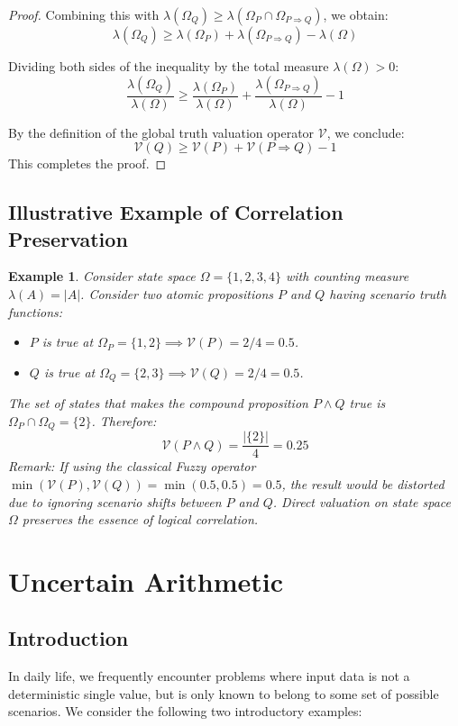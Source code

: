 \documentclass[a4paper,12pt,twoside]{memoir}
\newtheorem{example}{Example}[chapter]
\newcommand{\ddclmd}{\mathcal{V}} %
\begin{document}
\begin{proof}
		Combining this with $\lambda(\Omega_Q) \ge \lambda(\Omega_P \cap \Omega_{P \Rightarrow Q})$, we obtain:
		\[
		\lambda(\Omega_Q) \ge \lambda(\Omega_P) + \lambda(\Omega_{P \Rightarrow Q}) - \lambda(\Omega)
		\]
		
		Dividing both sides of the inequality by the total measure $\lambda(\Omega) > 0$:
		\[
		\frac{\lambda(\Omega_Q)}{\lambda(\Omega)} \ge \frac{\lambda(\Omega_P)}{\lambda(\Omega)} + \frac{\lambda(\Omega_{P \Rightarrow Q})}{\lambda(\Omega)} - 1
		\]
		
		By the definition of the global truth valuation operator $\ddclmd$, we conclude:
		\[
		\ddclmd(Q) \ge \ddclmd(P) + \ddclmd(P \Rightarrow Q) - 1
		\]
		This completes the proof.
	\end{proof}
	\section{Illustrative Example of Correlation Preservation}
	\begin{example}
		Consider state space $\Omega = \{1, 2, 3, 4\}$ with counting measure $\lambda(A) = |A|$. Consider two atomic propositions $P$ and $Q$ having scenario truth functions:
		\begin{itemize}[leftmargin=*]
			\item $P$ is true at $\Omega_P = \{1, 2\} \implies \ddclmd(P) = 2/4 = 0.5$.
			\item $Q$ is true at $\Omega_Q = \{2, 3\} \implies \ddclmd(Q) = 2/4 = 0.5$.
		\end{itemize}
		The set of states that makes the compound proposition $P \land Q$ true is $\Omega_P \cap \Omega_Q = \{2\}$. Therefore:
		\[
		\ddclmd(P \land Q) = \frac{|\{2\}|}{4} = 0.25
		\]
		\textit{Remark:} If using the classical Fuzzy operator $\min(\ddclmd(P), \ddclmd(Q)) = \min(0.5, 0.5) = 0.5$, the result would be distorted due to ignoring scenario shifts between $P$ and $Q$. Direct valuation on state space $\Omega$ preserves the essence of logical correlation.
	\end{example}
	
	\chapter{Uncertain Arithmetic}
	
	\section{Introduction}
	In daily life, we frequently encounter problems where input data is not a deterministic single value, but is only known to belong to some set of possible scenarios. We consider the following two introductory examples:
	
\end{document}
